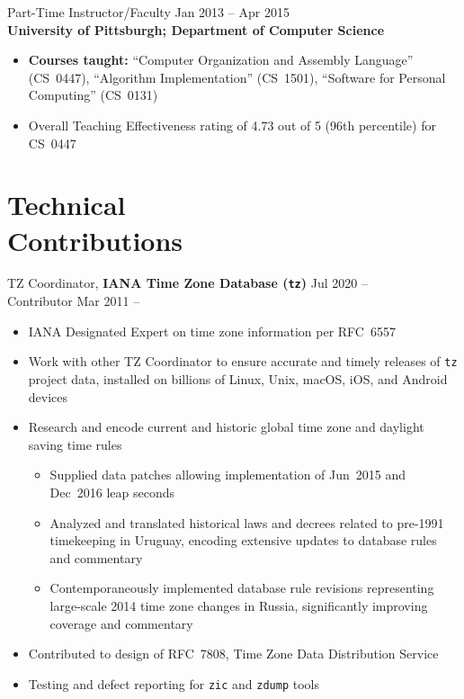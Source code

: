 \documentclass[11pt]{article}
\newcommand{\textdb}[1]{\fontseries{db}\selectfont#1\normalfont}
\newcommand{\present}{\phantom{Xxx 20XX}}
\begin{document}
\textdb{
Part-Time Instructor/Faculty
	\hfill Jan 2013 -- Apr 2015 \\
}
\textbf{University of Pittsburgh; Department of Computer Science}
\begin{itemize}
	\item \textbf{Courses taught:}
		``Computer Organization and Assembly Language'' (CS~0447),
		``Algorithm Implementation'' (CS~1501),
		``Software for Personal Computing'' (CS~0131)
	\item Overall Teaching Effectiveness rating of 4.73 out of 5
		(96th percentile) for CS~0447
\end{itemize}



\section{Technical\\ Contributions}

\textdb{
TZ Coordinator,
\textbf{IANA Time Zone Database (\texttt{tz})}
	\hfill Jul 2020 -- \present \\
}
\textdb{
Contributor
	\hfill Mar 2011 -- \present
}
\begin{itemize}
	\item IANA Designated Expert on time zone information per RFC~6557
	\item Work with other TZ Coordinator to ensure accurate and timely releases
		of \texttt{tz} project data,
		installed on billions of Linux, Unix, macOS, iOS, and Android devices
	\item Research and encode current and historic global time zone and daylight saving time rules
		\begin{itemize}
			\item Supplied data patches allowing implementation of
				Jun~2015 and Dec~2016 leap seconds
			\item Analyzed and translated historical laws and decrees
				related to pre-1991 timekeeping in Uruguay,
				encoding extensive updates to database rules and commentary
			\item Contemporaneously implemented database rule revisions
				representing large-scale 2014 time zone changes in Russia,
				significantly improving coverage and commentary
		\end{itemize}
	\item Contributed to design of RFC~7808, Time Zone Data Distribution Service
	\item Testing and defect reporting for \texttt{zic} and \texttt{zdump} tools
\end{itemize}
\end{document}
